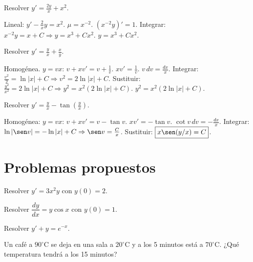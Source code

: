 \begin{prob}
Resolver \(y' = \frac{2y}{x} + x^2\).
\begin{myproof}
Lineal: \(y' - \frac{2}{x}y = x^2\). \(\mu = x^{-2}\). \((x^{-2}y)' = 1\). Integrar: \(x^{-2}y = x + C \Rightarrow y = x^3 + Cx^2\). \(\boxed{y = x^3 + Cx^2}\).
\end{myproof}
\end{prob}

\begin{prob}
Resolver \(y' = \frac{y}{x} + \frac{x}{y}\).
\begin{myproof}
Homogénea. \(y=vx\): \(v+xv' = v + \frac{1}{v}\). \(xv' = \frac{1}{v}\). \(v\,dv = \frac{dx}{x}\). Integrar: \(\frac{v^2}{2} = \ln|x| + C \Rightarrow v^2 = 2\ln|x| + C\). Sustituir: \(\frac{y^2}{x^2} = 2\ln|x| + C \Rightarrow y^2 = x^2(2\ln|x| + C)\). \(\boxed{y^2 = x^2(2\ln|x| + C)}\).
\end{myproof}
\end{prob}

\begin{prob}
Resolver \(y' = \frac{y}{x} - \tan\left(\frac{y}{x}\right)\).
\begin{myproof}
Homogénea: \(y=vx\): \(v+xv' = v - \tan v\). \(xv' = -\tan v\). \(\cot v\, dv = -\frac{dx}{x}\). Integrar: \(\ln|\sen v| = -\ln|x| + C \Rightarrow \sen v = \frac{C}{x}\). Sustituir: \(\boxed{x \sen(y/x) = C}\).
\end{myproof}
\end{prob}

\section{Problemas propuestos}

\begin{prob}
Resolver \(y' = 3x^2 y\) con \(y(0)=2\).
\end{prob}

\begin{prob}
Resolver \(\dfrac{dy}{dx} = y\cos x\) con \(y(0)=1\).
\end{prob}

\begin{prob}
Resolver \(y' + y = e^{-x}\).
\end{prob}

\begin{prob}
Un café a \(90^\circ\)C se deja en una sala a \(20^\circ\)C y a los 5 minutos está a \(70^\circ\)C. ¿Qué temperatura tendrá a los 15 minutos?
\end{prob}

